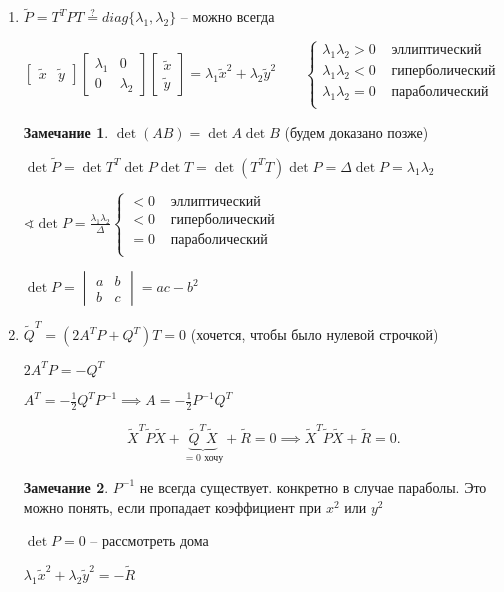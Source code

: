 \documentclass{book}
\newcommand{\tl}[1]{\widetilde{#1}}
\theoremstyle{definition}
\newtheorem*{note}{Замечание}
\begin{document}
\begin{enumerate}
    \item $\tl P = T^TPT \overset{?}{=} diag\{\lambda_1, \lambda_2\}$ -- можно всегда

        $\begin{bmatrix} \tl x&\tl y \end{bmatrix} \begin{bmatrix} \lambda_1 & 0\\0&\lambda_2 \end{bmatrix} \begin{bmatrix} \tl x\\ \tl y \end{bmatrix}  = \lambda_1\tl x^2 + \lambda_2\tl y^2\qquad \begin{cases}
        \lambda_1\lambda_2>0 & \text{ эллиптический }\\
        \lambda_1\lambda_2<0 & \text{ гиперболический}\\
        \lambda_1\lambda_2= 0& \text{ параболический}\\
        \end{cases}$

\begin{note}
    $\det(AB) = \det A \det B$ (будем доказано позже)
\end{note}

$\det \tl P = \det T^T\det P\det T = \det (T^TT)\det P = \Delta \det P = \lambda_1\lambda_2$

$\sphericalangle \det P = \frac{\lambda_1\lambda_2}{\Delta}\begin{cases}
    <0&\text{ эллиптический}\\
    <0& \text{ гиперболический}\\
    =0 & \text{ параболический}\\
\end{cases}$ 

$\det P = 
\begin{vmatrix}
    a&b\\b&c
\end{vmatrix} = ac-b^2$
\item $\tl Q^T = (2A^TP + Q^T)T = 0$ (хочется, чтобы было нулевой строчкой)

    $2A^TP = -Q^T$

    $A^T = -\frac{1}{2}Q^TP^{-1}\implies A = -\frac{1}{2}P^{-1}Q^T$

    \[
        \tl X^T\tl P\tl X + \underbrace{\tl Q^T\tl X}\limits_{=0 \text{ хочу}} + \tl R = 0\implies \tl X^T\tl P\tl X + \tl R = 0
    .\] 
    \begin{note}
        $P^{-1}$ не всегда существует. конкретно в случае параболы. Это можно понять, если пропадает коэффициент при  $x^2$ или $y^2$

        $\det P =0$ -- рассмотреть дома
    \end{note}

     $\lambda_1\tl x^2 + \lambda_2\tl y^2 = -\tl R$
\end{enumerate}
\end{document}
